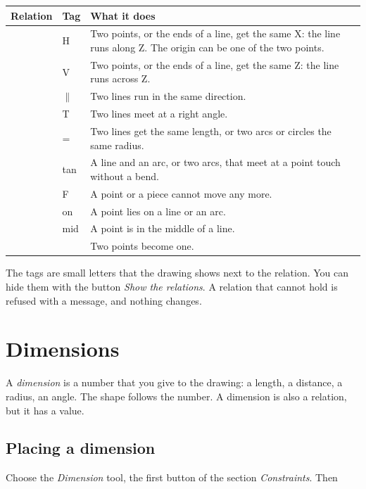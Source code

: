 \begin{center}
\begin{tabularx}{\textwidth}{@{}l l Y@{}}
\toprule
\textbf{Relation} & \textbf{Tag} & \textbf{What it does} \\
\midrule
{} & H & Two points, or the ends of a line, get the same X: the line runs along Z. The origin can be one of the two points. \\
 & V & Two points, or the ends of a line, get the same Z: the line runs across Z. \\
 & $\parallel$ & Two lines run in the same direction. \\
 & T & Two lines meet at a right angle. \\
 & = & Two lines get the same length, or two arcs or circles the same radius. \\
 & tan & A line and an arc, or two arcs, that meet at a point touch without a bend. \\
 & F & A point or a piece cannot move any more. \\
 & on & A point lies on a line or an arc. \\
 & mid & A point is in the middle of a line. \\
 & & Two points become one. \\
\bottomrule
\end{tabularx}
\end{center}

The tags are small letters that the drawing shows next to the relation. You can hide them with the button \emph{Show the relations}. A relation that cannot hold is refused with a message, and nothing changes.

\section{Dimensions}\label{sec:sketch:dimensions}

A \emph{dimension} is a number that you give to the drawing: a length, a distance, a radius, an angle. The shape follows the number. A dimension is also a relation, but it has a value.

\subsection{Placing a dimension}\label{sec:sketch:placing}
Choose the \emph{Dimension} tool, the first button of the section \emph{Constraints}. Then

